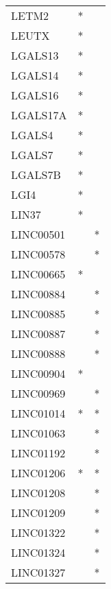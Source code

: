 \begin{longtable}{lcc}
LETM2            &              * &            \\
LEUTX            &              * &            \\
LGALS13          &              * &            \\
LGALS14          &              * &            \\
LGALS16          &              * &            \\
LGALS17A         &              * &            \\
LGALS4           &              * &            \\
LGALS7           &              * &            \\
LGALS7B          &              * &            \\
LGI4             &              * &            \\
LIN37            &              * &            \\
LINC00501        &                &          * \\
LINC00578        &                &          * \\
LINC00665        &              * &            \\
LINC00884        &                &          * \\
LINC00885        &                &          * \\
LINC00887        &                &          * \\
LINC00888        &                &          * \\
LINC00904        &              * &            \\
LINC00969        &                &          * \\
LINC01014        &              * &          * \\
LINC01063        &                &          * \\
LINC01192        &                &          * \\
LINC01206        &              * &          * \\
LINC01208        &                &          * \\
LINC01209        &                &          * \\
LINC01322        &                &          * \\
LINC01324        &                &          * \\
LINC01327        &                &          * \\

\end{longtable}
